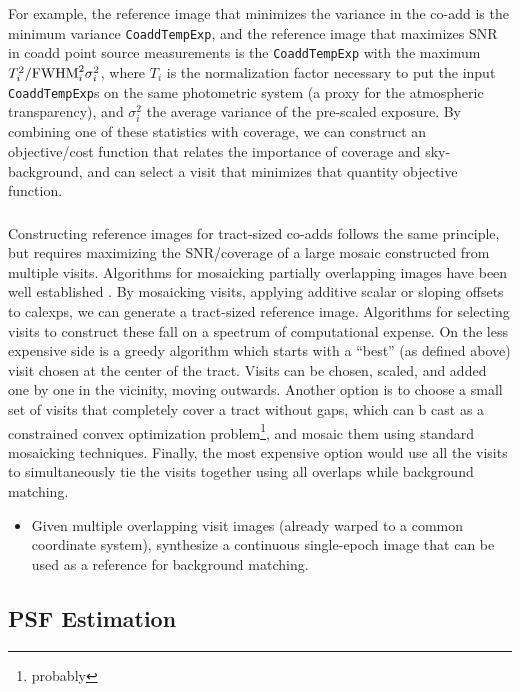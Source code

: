For example, the reference image that minimizes the variance in the co-add is the minimum variance \texttt{CoaddTempExp}, and
the reference image that maximizes SNR in coadd point source measurements is the \texttt{CoaddTempExp} with the maximum
$T^2_i/{\rm FWHM}^2_i \sigma^2_i$, where $T_i$ is
the normalization factor necessary to put the input \texttt{CoaddTempExp}s on the same photometric system (a proxy for the atmospheric transparency),
and $\sigma^2_i$ the average variance of the pre-scaled exposure.  By combining one of
these statistics with coverage, we can construct an objective/cost function that relates the importance of
coverage and sky-background, and can select a visit that minimizes that quantity objective function.

\subsubsection{}
Constructing reference images for tract-sized co-adds follows the same principle, but requires maximizing the
SNR/coverage of a large mosaic constructed from multiple visits.  Algorithms for mosaicking partially
overlapping images have been well established \citep[e.g.][]{Sick2013, Berriman2008}. By mosaicking visits,
applying additive scalar or sloping offsets to calexps, we can generate a tract-sized reference image.
Algorithms for selecting visits to construct these fall on a spectrum of computational expense. On the less
expensive side is a greedy algorithm which starts with a ``best'' (as defined above) visit chosen at the
center of the tract.  Visits can be chosen, scaled, and added one by one in the vicinity, moving outwards.
Another option is to choose a small set of visits that completely cover a tract without gaps, which can b
cast as a constrained convex optimization problem\footnote{probably}, and mosaic them using standard
mosaicking techniques.  Finally, the most expensive option would use all the visits to simultaneously tie the
visits together using all overlaps while background matching.

\begin{itemize}
\item Given multiple overlapping visit images (already warped to a common coordinate system), synthesize a continuous single-epoch image that can be used as a reference for background matching.
\end{itemize}

\subsection{PSF Estimation}
\label{sec:acPSFEstimation}

